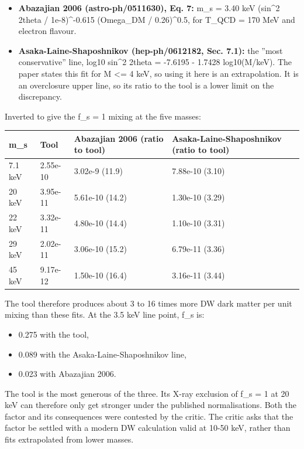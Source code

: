\documentclass[11pt,a4paper]{article}
\begin{document}
\begin{itemize}
  \item \textbf{Abazajian 2006 (astro-ph/0511630), Eq. 7:} m\_s = 3.40 keV (sin\textasciicircum{}2 2theta / 1e-8)\textasciicircum{}-0.615 (Omega\_DM / 0.26)\textasciicircum{}0.5, for T\_QCD = 170 MeV and electron flavour.
  \item \textbf{Asaka-Laine-Shaposhnikov (hep-ph/0612182, Sec. 7.1):} the ''most conservative'' line, log10 sin\textasciicircum{}2 2theta = -7.6195 - 1.7428 log10(M/keV). The paper states this fit for M \textless{}= 4 keV, so using it here is an extrapolation. It is an overclosure upper line, so its ratio to the tool is a lower limit on the discrepancy.
\end{itemize}
Inverted to give the f\_s = 1 mixing at the five masses:

\begin{longtable}{@{}p{}p{}p{}p{}@{}}
\toprule
\textbf{m\_s} & \textbf{Tool} & \textbf{Abazajian 2006 (ratio to tool)} & \textbf{Asaka-Laine-Shaposhnikov (ratio to tool)} \\ \midrule \endhead
7.1 keV & 2.55e-10 & 3.02e-9 (11.9) & 7.88e-10 (3.10) \\
20 keV & 3.95e-11 & 5.61e-10 (14.2) & 1.30e-10 (3.29) \\
22 keV & 3.32e-11 & 4.80e-10 (14.4) & 1.10e-10 (3.31) \\
29 keV & 2.02e-11 & 3.06e-10 (15.2) & 6.79e-11 (3.36) \\
45 keV & 9.17e-12 & 1.50e-10 (16.4) & 3.16e-11 (3.44) \\
\bottomrule\end{longtable}
The tool therefore produces about 3 to 16 times more DW dark matter per unit mixing than these fits. At the 3.5 keV line point, f\_s is:

\begin{itemize}
  \item 0.275 with the tool,
  \item 0.089 with the Asaka-Laine-Shaposhnikov line,
  \item 0.023 with Abazajian 2006.
\end{itemize}
The tool is the most generous of the three. Its X-ray exclusion of f\_s = 1 at 20 keV can therefore only get stronger under the published normalisations. Both the factor and its consequences were contested by the critic. The critic asks that the factor be settled with a modern DW calculation valid at 10-50 keV, rather than fits extrapolated from lower masses.
\end{document}
